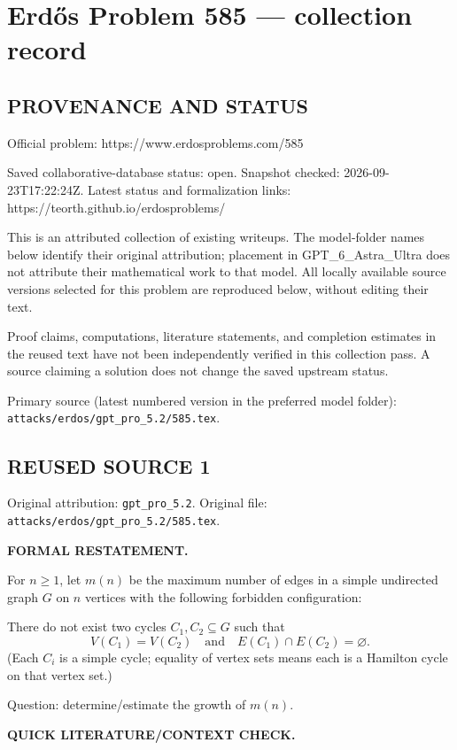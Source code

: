 \section*{Erd\H{o}s Problem 585 --- collection record}

\subsection*{PROVENANCE AND STATUS}
Official problem: https://www.erdosproblems.com/585

Saved collaborative-database status: open.
Snapshot checked: 2026-09-23T17:22:24Z.
Latest status and formalization links: https://teorth.github.io/erdosproblems/

This is an attributed collection of existing writeups. The model-folder names below identify their original attribution; placement in GPT\_6\_Astra\_Ultra does not attribute their mathematical work to that model. All locally available source versions selected for this problem are reproduced below, without editing their text.

Proof claims, computations, literature statements, and completion estimates in the reused text have not been independently verified in this collection pass. A source claiming a solution does not change the saved upstream status.

Primary source (latest numbered version in the preferred model folder): \texttt{attacks/erdos/gpt\_pro\_5.2/585.tex}.

\subsection*{REUSED SOURCE 1}
Original attribution: \texttt{gpt\_pro\_5.2}.
Original file: \texttt{attacks/erdos/gpt\_pro\_5.2/585.tex}.


\noindent\textbf{FORMAL RESTATEMENT.}

For $n\ge 1$, let $m(n)$ be the maximum number of edges in a simple undirected graph $G$ on $n$ vertices with the following forbidden configuration:

There do not exist two cycles $C_1,C_2\subseteq G$ such that
\[
V(C_1)=V(C_2)\quad\text{and}\quad E(C_1)\cap E(C_2)=\varnothing.
\]
(Each $C_i$ is a simple cycle; equality of vertex sets means each is a Hamilton cycle on that vertex set.)

Question: determine/estimate the growth of $m(n)$.

\bigskip
\noindent\textbf{QUICK LITERATURE/CONTEXT CHECK.}

